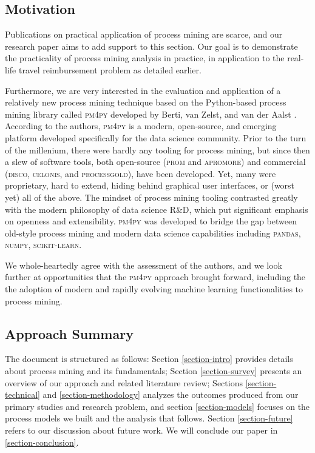 \documentclass[conference]{IEEEtran}
\begin{document}
\subsection{Motivation}

Publications on practical application of process mining are scarce,
and our research paper aims to add support to this section. Our goal is
to demonstrate the practicality of process mining analysis
in practice, in application to the real-life travel reimbursement problem
as detailed earlier.

Furthermore, we are very interested in the evaluation and application
of a relatively new process mining technique based on
the Python-based process mining library called \textsc{pm4py}
developed by Berti, van Zelst, and van der Aalst \cite{BeZe2019}.
According to the authors,
\textsc{pm4py} is a modern, open-source, and emerging platform developed
specifically for the data science community. Prior to the turn of the
millenium,
there were hardly any tooling for process mining, but
since then a slew of software tools, both open-source
(\textsc{prom} and \textsc{apromore}) and commercial
(\textsc{disco}, \textsc{celonis}, and \textsc{processgold}),
have been developed. Yet, many were proprietary, hard to extend,
hiding behind graphical user interfaces, or (worst yet) all of the above.
The mindset of process mining
tooling contrasted greatly with the modern philosophy of data science R\&D,
which put significant emphasis on openness and extensibility.
\textsc{pm4py} was developed to bridge the gap
between old-style process mining and modern data science
capabilities including
\textsc{pandas}, \textsc{numpy}, \textsc{scikit-learn}.

We whole-heartedly
agree with the assessment of the authors, and we look further at opportunities
that the \textsc{pm4py} approach brought forward, including the
the adoption of modern and rapidly evolving machine learning
functionalities to process mining.


\subsection{Approach Summary}

The document is structured as follows: Section \ref{section-intro} provides details about
process mining and its fundamentals; Section \ref{section-survey} presents an overview of
our approach and related literature review; Sections \ref{section-technical}
and \ref{section-methodology} analyzes the
outcomes produced from our primary studies and research problem,
and section \ref{section-models} focuses on the process models we built
and the analysis that follows. Section \ref{section-future}
refers to our discussion about future work. We will conclude our paper
in \ref{section-conclusion}.
\end{document}
